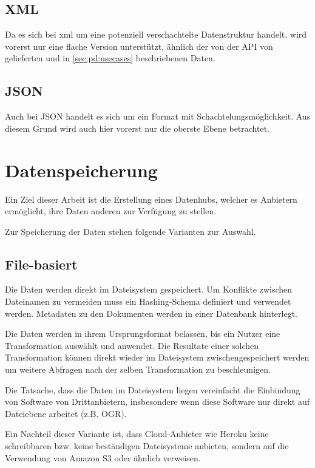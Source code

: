 \subsection{XML}
Da es sich bei \acs{xml} um eine potenziell verschachtelte Datenstruktur handelt, wird vorerst nur eine flache Version unterstützt, ähnlich der von der API von  gelieferten und in \cref{sec:pd:usecases} beschriebenen Daten. 

\subsection{JSON}
Auch bei JSON handelt es sich um ein Format mit Schachtelungsmöglichkeit. Aus diesem Grund wird auch hier vorerst nur die oberste Ebene betrachtet.

\section{Datenspeicherung}
Ein Ziel dieser Arbeit ist die Erstellung eines Datenhubs, welcher es Anbietern ermöglicht, ihre Daten anderen zur Verfügung zu stellen. 

Zur Speicherung der Daten stehen folgende Varianten zur Auswahl.

\subsection{File-basiert}
Die Daten werden direkt im Dateisystem gespeichert. Um Konflikte zwischen Dateinamen zu vermeiden muss ein Hashing-Schema definiert und verwendet werden. Metadaten zu den Dokumenten werden in einer Datenbank hinterlegt.

Die Daten werden in ihrem Ursprungsformat belassen, bis ein Nutzer eine Transformation auswählt und anwendet. Die Resultate einer solchen Transformation können direkt wieder im Dateisystem zwischengespeichert werden um weitere Abfragen nach der selben Transformation zu beschleunigen.

Die Tatsache, dass die Daten im Dateisystem liegen vereinfacht die Einbindung von Software von Drittanbietern, insbesondere wenn diese Software nur direkt auf Dateiebene arbeitet (z.B. OGR).

Ein Nachteil dieser Variante ist, dass Cloud-Anbieter wie Heroku keine schreibbaren \cite{herokuReadOnlyFilesystem} bzw. keine beständigen \cite{herokuEphemeralFilesystem} Dateisysteme anbieten, sondern auf die Verwendung von Amazon S3 oder ähnlich verweisen.

